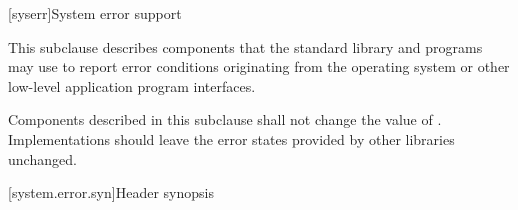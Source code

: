 [syserr]{System error support}

\pnum
This subclause describes components that the standard library and
\Cpp{} programs may use to report error conditions originating from
the operating system or other low-level application program interfaces.

\pnum
Components described in this subclause shall not change the value of
.
Implementations should leave the error states provided by other
libraries unchanged.

[system.error.syn]{Header  synopsis}

%
%
%
%
%
%
%
%
